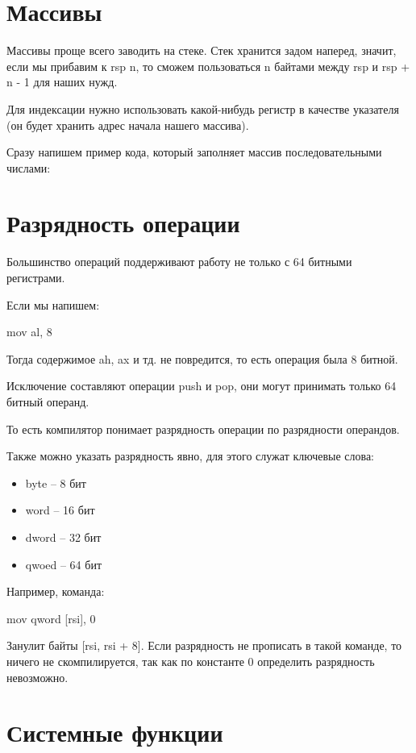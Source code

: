 \documentclass[a4paper,12pt]{article}
\begin{document}


\section{Массивы}

Массивы проще всего заводить на стеке. Стек хранится задом наперед,
значит, если мы прибавим к rsp n, то сможем пользоваться n байтами
между rsp и rsp + n - 1 для наших нужд.

Для индексации нужно использовать какой-нибудь регистр в качестве
указателя (он будет хранить адрес начала нашего массива).

Сразу напишем пример кода, который заполняет массив последовательными
числами:



\section{Разрядность операции}

Большинство операций поддерживают работу не только с 64 битными
регистрами.

Если мы напишем:

mov al, 8

Тогда содержимое ah, ax и тд. не повредится, то есть операция была 8
битной.

Исключение составляют операции push и pop, они могут принимать только
64 битный операнд.

То есть компилятор понимает разрядность операции по разрядности
операндов.

Также можно указать разрядность явно, для этого служат ключевые слова:

\begin{itemize}
  \item byte -- 8 бит
  \item word -- 16 бит
  \item dword -- 32 бит
  \item qwoed -- 64 бит
\end{itemize}

Например, команда:

mov qword [rsi], 0
 
Занулит байты [rsi, rsi + 8]. Если разрядность не прописать в такой
команде, то ничего не скомпилируется, так как по константе 0
определить разрядность невозможно.

\section{Системные функции}
\end{document}
